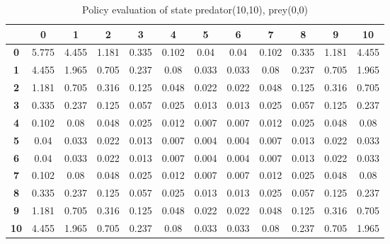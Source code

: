 \documentclass[11pt]{article}
\begin{document}
\begin{center}
\begin{table*}[ht]
{\small
\hfill{}
\begin{tabular}{c|c|c|c|c|c|c|c|c|c|c|c}
\textbf{} & \textbf{0} & \textbf{1} & \textbf{2} & \textbf{3} & \textbf{4} & \textbf{5} & \textbf{6} & \textbf{7} & \textbf{8} & \textbf{9} & \textbf{10}\\
	\hline
\textbf{0}& 5.775	& 4.455	& 1.181	& 0.335	& 0.102	& 0.04	& 0.04	& 0.102	& 0.335	& 1.181	& 4.455	\\
\textbf{1}& 4.455	& 1.965	& 0.705	& 0.237	& 0.08	& 0.033	& 0.033	& 0.08	& 0.237	& 0.705	& 1.965	\\
\textbf{2}& 1.181	& 0.705	& 0.316	& 0.125	& 0.048	& 0.022	& 0.022	& 0.048	& 0.125	& 0.316	& 0.705	\\
\textbf{3}& 0.335	& 0.237	& 0.125	& 0.057	& 0.025	& 0.013	& 0.013	& 0.025	& 0.057	& 0.125	& 0.237	\\
\textbf{4}& 0.102	& 0.08	& 0.048	& 0.025	& 0.012	& 0.007	& 0.007	& 0.012	& 0.025	& 0.048	& 0.08	\\
\textbf{5}& 0.04	& 0.033	& 0.022	& 0.013	& 0.007	& 0.004	& 0.004	& 0.007	& 0.013	& 0.022	& 0.033	\\
\textbf{6}& 0.04	& 0.033	& 0.022	& 0.013	& 0.007	& 0.004	& 0.004	& 0.007	& 0.013	& 0.022	& 0.033	\\
\textbf{7}& 0.102	& 0.08	& 0.048	& 0.025	& 0.012	& 0.007	& 0.007	& 0.012	& 0.025	& 0.048	& 0.08	\\
\textbf{8}& 0.335	& 0.237	& 0.125	& 0.057	& 0.025	& 0.013	& 0.013	& 0.025	& 0.057	& 0.125	& 0.237	\\
\textbf{9}& 1.181	& 0.705	& 0.316	& 0.125	& 0.048	& 0.022	& 0.022	& 0.048	& 0.125	& 0.316	& 0.705	\\
\textbf{10}& 4.455	& 1.965	& 0.705	& 0.237	& 0.08	& 0.033	& 0.033	& 0.08	& 0.237	& 0.705	& 1.965	\\
\end{tabular}}
\hfill{}
\caption{Policy evaluation of state predator(10,10), prey(0,0)}
\label{state4}
\end{table*}
\end{center}	
\end{document}
